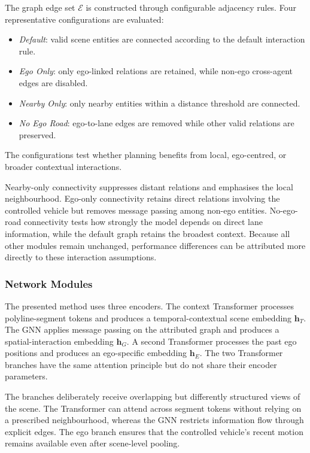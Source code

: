 The graph edge set \(\mathcal{E}\) is constructed through configurable adjacency rules. Four representative configurations are evaluated:
\begin{itemize}
    \item \textit{Default}: valid scene entities are connected according to the default interaction rule.
    \item \textit{Ego Only}: only ego-linked relations are retained, while non-ego cross-agent edges are disabled.
    \item \textit{Nearby Only}: only nearby entities within a distance threshold are connected.
    \item \textit{No Ego Road}: ego-to-lane edges are removed while other valid relations are preserved.
\end{itemize}
The configurations test whether planning benefits from local, ego-centred, or broader contextual interactions.

Nearby-only connectivity suppresses distant relations and emphasises the local neighbourhood. Ego-only connectivity retains direct relations involving the controlled vehicle but removes message passing among non-ego entities. No-ego-road connectivity tests how strongly the model depends on direct lane information, while the default graph retains the broadest context. Because all other modules remain unchanged, performance differences can be attributed more directly to these interaction assumptions.

\subsubsection{Network Modules}
\label{subsubsec:magnet_network_modules}

The presented method uses three encoders. The context Transformer processes polyline-segment tokens and produces a temporal-contextual scene embedding \(\mathbf{h}_T\). The GNN applies message passing on the attributed graph and produces a spatial-interaction embedding \(\mathbf{h}_G\). A second Transformer processes the past ego positions and produces an ego-specific embedding \(\mathbf{h}_E\). The two Transformer branches have the same attention principle but do not share their encoder parameters.

The branches deliberately receive overlapping but differently structured views of the scene. The Transformer can attend across segment tokens without relying on a prescribed neighbourhood, whereas the GNN restricts information flow through explicit edges. The ego branch ensures that the controlled vehicle's recent motion remains available even after scene-level pooling.

